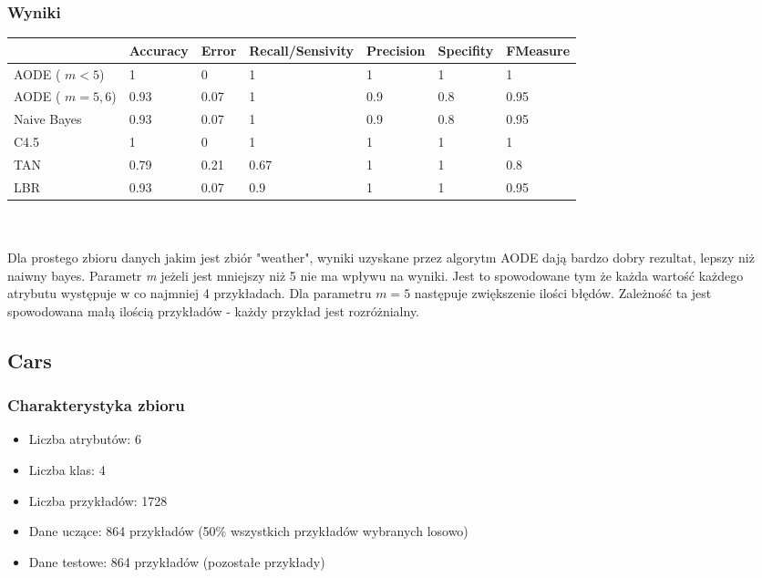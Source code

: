 \documentclass[16]{article}
\begin{document}
\subsubsection{Wyniki}

\begin{tabular}{ |l|l|l|l|l|l|l| }
\hline
&  Accuracy & Error & Recall/Sensivity & Precision & Specifity & FMeasure
\\ \hline
AODE ( $m < 5$)& 1 & 0 & 1 & 1 & 1 & 1
\\ \hline
AODE ( $m = 5, 6$) & 0.93 & 0.07 & 1 & 0.9 & 0.8 & 0.95
\\ \hline
Naive Bayes & 0.93 & 0.07 & 1 & 0.9 & 0.8 & 0.95
\\ \hline
C4.5 & 1 & 0 & 1 & 1 & 1 & 1
\\ \hline
TAN & 0.79 & 0.21 & 0.67 & 1 & 1 & 0.8
\\ \hline
LBR & 0.93 & 0.07 & 0.9 & 1 & 1 & 0.95
\\ \hline

\end{tabular}
\\\\
Dla prostego zbioru danych jakim jest zbiór "weather", wyniki uzyskane przez algorytm AODE dają bardzo dobry rezultat, lepszy niż naiwny bayes. Parametr \textit{m} jeżeli jest mniejszy niż 5 nie ma wpływu na wyniki. Jest to spowodowane tym że każda wartość każdego atrybutu występuje w co najmniej 4 przykładach. Dla parametru $m = 5$ następuje zwiększenie ilości błędów. Zależność ta jest spowodowana małą ilością przykładów - każdy przykład jest rozróżnialny. 

\subsection{Cars}
\subsubsection{Charakterystyka zbioru}
\begin{itemize}
	\item Liczba atrybutów: 6
	\item Liczba klas: 4
	\item Liczba przykładów: 1728
	\item Dane uczące: 864 przykładów (50\% wszystkich przykładów wybranych losowo) 
	\item Dane testowe: 864 przykładów (pozostałe przykłady)
\end{itemize}
\end{document}
